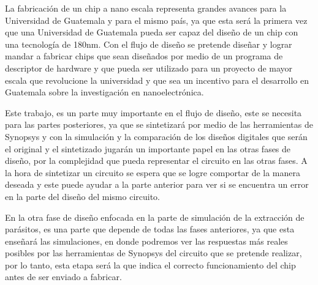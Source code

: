 

La fabricación de un chip a nano escala representa grandes avances para la Universidad de Guatemala y para el mismo país, ya que esta será la primera vez que una Universidad de Guatemala pueda ser capaz del diseño de un chip con una tecnología de 180nm. Con el flujo de diseño se pretende diseñar y lograr mandar a fabricar chips que sean diseñados por medio de un programa de descriptor de hardware y que pueda ser utilizado para un proyecto de mayor escala que revolucione la universidad y que sea un incentivo para el desarrollo en Guatemala sobre la investigación en nanoelectrónica.

Este trabajo, es un parte muy importante en el flujo de diseño, este se necesita para las partes posteriores, ya que se sintetizará por medio de las herramientas de Synopsys y con la simulación y la comparación de los diseños digitales que serán el original y el sintetizado jugarán un importante papel en las otras fases de diseño, por la complejidad que pueda representar el circuito en las otras fases. A la hora de sintetizar un circuito se espera que se logre comportar de la manera deseada y este puede ayudar a la parte anterior para ver si se encuentra un error en la parte del diseño del mismo circuito.

En la otra fase de diseño enfocada en la parte de simulación de la extracción de parásitos, es una parte que depende de todas las fases anteriores, ya que esta enseñará las simulaciones, en donde podremos ver las respuestas más reales posibles por las herramientas de Synopsys del circuito que se pretende realizar, por lo tanto, esta etapa será la que indica el correcto funcionamiento del chip antes de ser enviado a fabricar.









